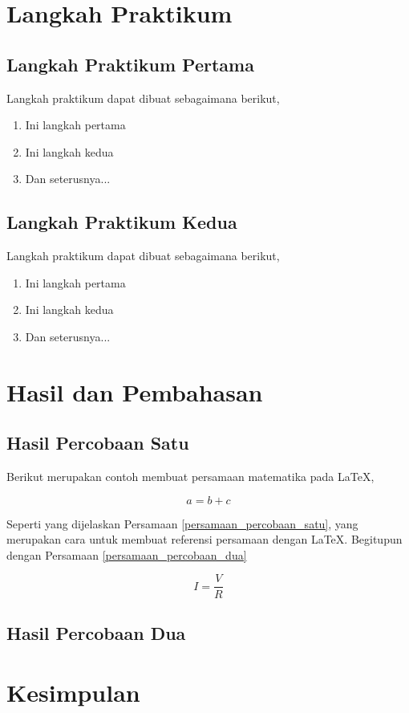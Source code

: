 \documentclass[12 pt]{article}
\begin{document}
\section{Langkah Praktikum}

\subsection{Langkah Praktikum Pertama}

Langkah praktikum dapat dibuat sebagaimana berikut,

\begin{enumerate}
    \item Ini langkah pertama
    \item Ini langkah kedua
    \item Dan seterusnya...
\end{enumerate}

\subsection{Langkah Praktikum Kedua}

Langkah praktikum dapat dibuat sebagaimana berikut,

\begin{enumerate}
    \item Ini langkah pertama
    \item Ini langkah kedua
    \item Dan seterusnya...
\end{enumerate}

\section{Hasil dan Pembahasan}

\subsection{Hasil Percobaan Satu}

Berikut merupakan contoh membuat persamaan matematika pada \LaTeX,
    
\begin{equation}
\label{persamaan_percobaan_satu}
    a = b + c
\end{equation}

Seperti yang dijelaskan Persamaan \eqref{persamaan_percobaan_satu}, yang merupakan cara untuk membuat referensi persamaan dengan \LaTeX. Begitupun dengan Persamaan \eqref{persamaan_percobaan_dua}

\begin{equation}
    \label{persamaan_percobaan_dua}
    I = \frac{V}{R}
\end{equation}

\subsection{Hasil Percobaan Dua}

\section{Kesimpulan}
\end{document}
